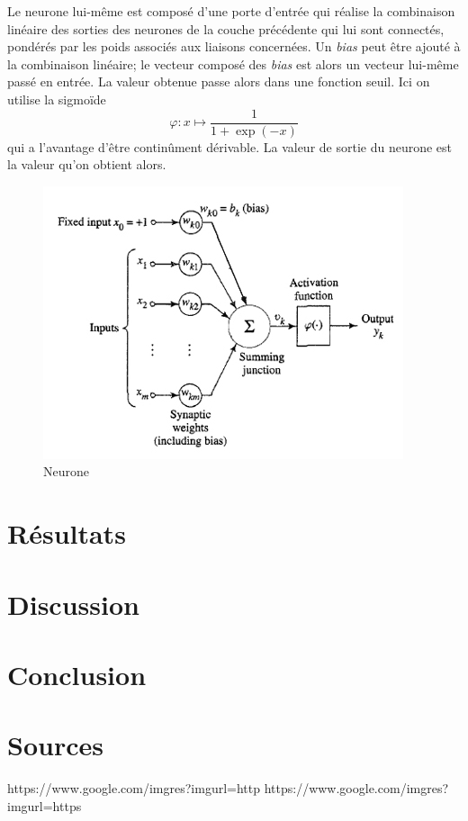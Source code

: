 \documentclass[a4paper,10pt]{article}
\begin{document}
Le neurone lui-même est composé d'une porte d'entrée qui réalise la combinaison linéaire des sorties des neurones de la couche
précédente qui lui sont connectés, pondérés par les poids associés aux liaisons concernées. Un \textit{bias} peut être ajouté
à la combinaison linéaire; le vecteur composé des \textit{bias} est alors un vecteur lui-même passé en entrée. La valeur obtenue
passe alors dans une fonction seuil. Ici on utilise la sigmoïde $$ \varphi : x \longmapsto \frac{1}{1+\exp(-x)}$$ qui a l'avantage
d'être continûment dérivable. La valeur de sortie du neurone est la valeur qu'on obtient alors.
\begin{figure}[h]
\centering
\includegraphics[scale = 0.6]{neuron}
\caption{Neurone}
 
\end{figure}

\section{Résultats}

\section{Discussion}

\section{Conclusion}

\section{Sources}

https://www.google.com/imgres?imgurl=http%
https://www.google.com/imgres?imgurl=https%
\end{document}
